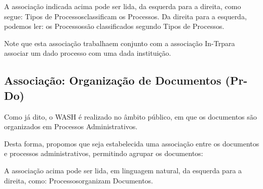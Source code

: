 \documentclass[
12pt,		%
openright,	%
twoside,  %
a4paper,			%
chapter=TITLE,		%
english,			%
french,				%
spanish,			%
brazil				%
]{USPSC-classe/USPSC}
\begin{document}
A associa\c{c}\~ao indicada acima pode ser lida, da esquerda para a direita, como segue: \textquotedbl Tipos de Processos\textquotedbl  classificam os \textquotedbl Processos\textquotedbl . Da direita para a esquerda, podemos ler: os \textquotedbl Processos\textquotedbl  s\~ao classificados segundo \textquotedbl Tipos de Processos\textquotedbl .










Note que esta associa\c{c}\~ao \textquotedbl trabalha\textquotedbl  em conjunto com a associa\c{c}\~ao \textquotedbl In-Tr\textquotedbl  para associar um dado processo com uma dada institui\c{c}\~ao.










\subsection[Associa\c{c}\~ao: Organiza\c{c}\~ao de Documentos (Pr-Do)]{Associa\c{c}\~ao: Organiza\c{c}\~ao de Documentos (Pr-Do)}\label{Associa\c{c}\~ao: Organiza\c{c}\~ao de Documentos (Pr-Do)}
Como j\'a dito, o WASH \'e realizado no \^ambito p\'ublico, em que os documentos s\~ao organizados em Processos Administrativos.










Desta forma, propomos que seja estabelecida uma associa\c{c}\~ao entre os documentos e processos administrativos, permitindo agrupar os documentos:












A associa\c{c}\~ao acima pode ser lida, em linguagem natural, da esquerda para a direita, como: \textquotedbl Processos\textquotedbl  organizam \textquotedbl Documentos\textquotedbl .
\end{document}

